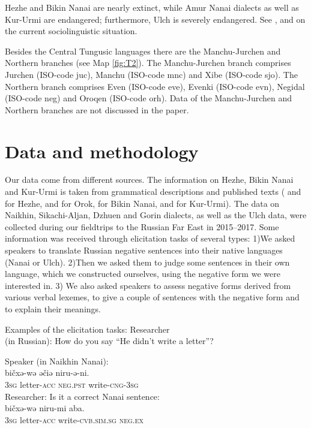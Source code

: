 \documentclass[output=paper,colorlinks,citecolor=brown]{langscibook}
\begin{document}
Hezhe and Bikin Nanai are nearly extinct, while Amur Nanai dialects as well as Kur-Urmi are endangered; furthermore, Ulch is severely endangered. See \citet{gerasimova2002a}, \citet{sumbatova2016a} and \citet{kalinina2016a} on the current sociolinguistic situation.

Besides the Central Tungusic languages there are the Manchu-Jurchen and Northern branches (see Map \ref{fig:T2}). The Manchu-Jurchen branch comprises Jurchen (ISO-code juc), Manchu (ISO-code mnc) and Xibe (ISO-code sjo). The Northern branch comprises Even (ISO-code eve), Evenki (ISO-code evn), Negidal (ISO-code neg) and Oroqen (ISO-code orh). Data of the Manchu-Jurchen and Northern branches are not discussed in the paper.

\section{Data and methodology}\label{sec:T3}

Our data come from different sources. The information on Hezhe, Bikin Nanai and Kur-Urmi is taken from grammatical descriptions and published texts (\citealt{zhang1989a} and \citealt{zhang2013a} for Hezhe,
\citealt{petrova1967a} and \citealt{tsumagari2009a} for Orok,
\citealt{sem1976a} for Bikin Nanai, and
\citealt{sunik1958a} for Kur-Urmi). The data on Naikhin, Sikachi-Aljan, Dzhuen and Gorin dialects, as well as the Ulch data, were collected during our fieldtrips to the Russian Far East in 2015–2017. Some information was received through elicitation tasks of several types: 1)\enspace  We asked speakers to translate Russian negative sentences into their native languages (Nanai or Ulch). 2)\enspace  Then we asked them to judge some sentences in their own language, which we constructed ourselves, using the negative form we were interested in. 3) We also asked speakers to assess negative forms derived from various verbal lexemes, to give a couple of sentences with the negative form and to explain their meanings.

\largerpage

\ea
Examples of the elicitation tasks:
\ea  Researcher   \\
    (in Russian):  {How do you say “He didn’t write a letter”?} \\
    \medskip

    Speaker (in  Naikhin Nanai):\\
      {bičxə-wə}  {əčiə}  {{niru-ə-ni.}} \\
        \textsc{3sg}  letter-\textsc{acc}  \textsc{neg.pst}  {write-\textsc{cng-3sg}} \\
\medskip
\ex  Researcher:  {Is it a correct Nanai sentence:} \\
      {bičxə-wə}  {niru-mi}  {{aba.}} \\
        \textsc{3sg}  letter-\textsc{acc}  write-\textsc{cvb.sim.sg}  {\textsc{neg.ex}} \\
\medskip
\end{document}
